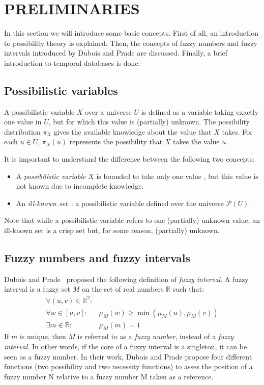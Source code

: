 \documentclass[twoside,twocolumn,a4paper]{article}
\newcommand{\Pow}{\mathcal{P}}
\begin{document}
\section{\label{sec:preliminaries}PRELIMINARIES}
In this section we will introduce some basic concepts. First of all, an introduction to possibility theory is explained. Then, the concepts of fuzzy numbers and fuzzy intervals introduced by Dubois and Prade \cite{Dubois1983} are discussed. Finally, a brief introduction to temporal databases is done.

\subsection{\label{subsec:possibilistic-variables}Possibilistic variables}
A possibilistic variable $X$ over a universe $U$ is defined as a variable taking exactly one value in $U$, but for which this value is (partially) unknown. The possibility distribution $\pi_X$ gives the available knowledge about the value that $X$ takes. For each $u\in U$, $\pi_X(u)$ represents the possibility that $X$ takes the value $u$.

It is important to understand the difference between the following two concepts:
\begin{itemize}
\item
A \emph{possibilistic variable} $X$ is bounded to take only one value , but this value is not known due to incomplete knowledge. 
\item
An \emph{ill-known set}~\cite{Dubois88b}: a possibilistic variable defined over the universe $\Pow(U)$.
\end{itemize}

Note that while a possibilistic variable refers to one (partially) unknown value, an ill-known set is a crisp set but, for some reason, (partially) unknown.


\subsection{\label{subsec:fuzzy-numbers}Fuzzy numbers and fuzzy intervals}
Dubois and Prade~\cite{Dubois1983} proposed the following definition of \emph{fuzzy interval}.
A fuzzy interval is a fuzzy set $M$ on the set of real numbers $\mathbb{R}$ such that:
\begin{eqnarray}
\forall (u,v)\in\mathbb{R}^2:&\\
\nonumber
\forall w \in [u,v]:&\mu_M(w) \geq\min(\mu_M(u),\mu_M(v))  \\
\exists m \in \mathbb{R}:& \mu_M(m)=1 
\end{eqnarray}
If $m$ is unique, then $M$ is referred to as a \emph{fuzzy number}, instead of a \emph{fuzzy interval}. In other words, if the core of a fuzzy interval is a singleton, it can be seen as a fuzzy number. In their work, Dubois and Prade propose four different functions (two possibility and two necessity functions) to asses the position of a fuzzy number N relative to  a fuzzy number M taken as a reference.
\end{document}
